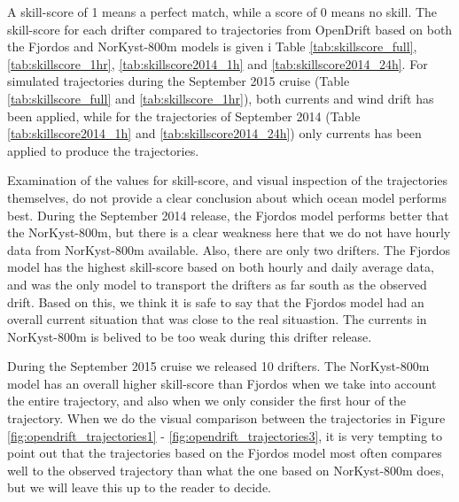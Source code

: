 A skill-score of 1 means a perfect match, while a score of 0 means no skill. %
The skill-score for each drifter compared to trajectories from OpenDrift based on both the Fjordos and NorKyst-800m models is given i Table \ref{tab:skillscore_full}, \ref{tab:skillscore_1hr}, \ref{tab:skillscore2014_1h} and \ref{tab:skillscore2014_24h}. For simulated trajectories during the September 2015 cruise (Table \ref{tab:skillscore_full} and \ref{tab:skillscore_1hr}), both currents and wind drift has been applied, while for the trajectories of September 2014 (Table \ref{tab:skillscore2014_1h} and \ref{tab:skillscore2014_24h}) only currents has been applied to produce the trajectories.

Examination of the values for skill-score, and visual inspection of the trajectories themselves, do not provide a clear conclusion about which ocean model performs best. During the September 2014 release, the Fjordos model performs better that the NorKyst-800m, but there is a clear weakness here that we do not have hourly data from NorKyst-800m available. Also, there are only two drifters. The Fjordos model has the highest skill-score based on both hourly and daily average data, and was the only model to transport the drifters as far south as the observed drift. Based on this, we think it is safe to say that the Fjordos model had an overall current situation that was close to the real situastion. The currents in NorKyst-800m is belived to be too weak during this drifter release.

During the September 2015 cruise we released 10 drifters. The NorKyst-800m model has an overall higher skill-score than Fjordos when we take into account the entire trajectory, and  also when we only consider the first hour of the trajectory. When we do the visual comparison between the trajectories in Figure \ref{fig:opendrift_trajectories1} - \ref{fig:opendrift_trajectories3}, it is very tempting to point out that the trajectories based on the Fjordos model most often compares well to the observed trajectory than what the one based on NorKyst-800m does, but we will leave this up to the reader to decide.

